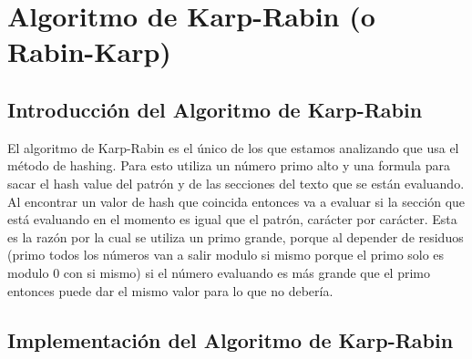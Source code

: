 \section*{Algoritmo de Karp-Rabin (o Rabin-Karp)}
{}

\subsection*{Introducción del Algoritmo de Karp-Rabin}
\quad El algoritmo de Karp-Rabin es el único de los que estamos analizando que usa el método de hashing. Para esto utiliza un número primo alto y una formula para sacar el hash value del patrón y de las secciones del texto que se están evaluando. Al encontrar un valor de hash que coincida entonces va a evaluar si la sección que está evaluando en el momento es igual que el patrón, carácter por carácter. Esta es la razón por la cual se utiliza un primo grande, porque al depender de residuos (primo todos los números van a salir modulo si mismo porque el primo solo es modulo 0 con si mismo) si el número evaluando es más grande que el primo entonces puede dar el mismo valor para lo que no debería.


\subsection*{Implementación del Algoritmo de Karp-Rabin}

